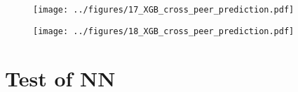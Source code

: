 \documentclass[10pt,a4paper,twocolumn]{article}
\begin{document}
\begin{figure}[H]
	\begin{center}
		\texttt{[image: ../figures/17\_XGB\_cross\_peer\_prediction.pdf]}
	\end{center}
\end{figure}

\begin{figure}[H]
	\begin{center}
		\texttt{[image: ../figures/18\_XGB\_cross\_peer\_prediction.pdf]}
	\end{center}
\end{figure}

\section{Test of NN}
\end{document}

